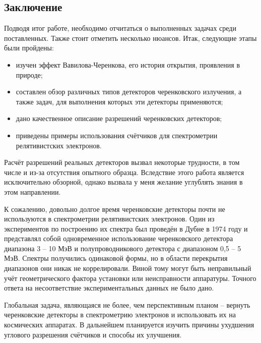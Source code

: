 \begin{Kur-Finish}
	\fontsize{16}{14pt}\selectfont
	\newpage
	
	\part{Заключение}
	\label{sec:part}
	Подводя итог работе, необходимо отчитаться о выполненных задачах среди поставленных. Также стоит отметить несколько нюансов. Итак, следующие этапы были пройдены:
	\begin{itemize}
		\item изучен эффект Вавилова-Черенкова, его история открытия, проявления в природе;
		\item составлен обзор различных типов детекторов черенковского излучения, а также задач, для выполнения которых эти детекторы применяются;
		\item дано качественное описание разрешений черенковских детекторов;
		\item приведены примеры использования счётчиков для спектрометрии релятивистских электронов.
	\end{itemize}
	
	Расчёт разрешений реальных детекторов вызвал некоторые трудности, в том числе и из-за отсутствия опытного образца. Вследствие этого работа является исключительно обзорной, однако вызвала у меня желание углублять знания в этом направлении.
	
	К сожалению, довольно долгое время черенковские детекторы почти не используются в спектрометрии релятивистских электронов. 
	Один из экспериментов по построению их спектра был проведён в Дубне в 1974 году и представлял собой одновременное использование черенковского детектора диапазона 3 -- 10 МэВ и полупроводникового детектора с диапазоном 0,5 -- 5 МэВ. Спектры получились одинаковой формы, но в области перекрытия диапазонов они никак не коррелировали. Виной тому могут быть неправильный учёт геометрического фактора установки или неисправности аппаратуры. Точного ответа на несоответствие экспериментальных данных не было дано. 
	
	 Глобальная задача, являющаяся не более, чем перспективным планом -- вернуть черенковские детекторы в спектрометрию электронов и использовать их на космических аппаратах.
	 В дальнейшем планируется изучить причины ухудшения углового разрешения счётчиков и способы их улучшения.
\end{Kur-Finish}